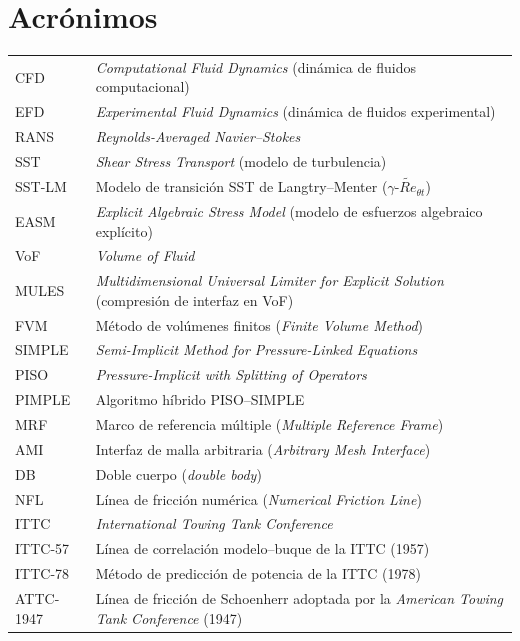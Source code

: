 \section*{Acrónimos}
\begin{longtable}{@{}p{} p{}@{}}
CFD     & \textit{Computational Fluid Dynamics} (dinámica de fluidos computacional) \\
EFD     & \textit{Experimental Fluid Dynamics} (dinámica de fluidos experimental) \\
RANS    & \textit{Reynolds-Averaged Navier--Stokes} \\
SST     & \textit{Shear Stress Transport} (modelo de turbulencia) \\
SST-LM  & Modelo de transición SST de Langtry--Menter ($\gamma$-$\widetilde{Re}_{\theta t}$) \\
EASM    & \textit{Explicit Algebraic Stress Model} (modelo de esfuerzos algebraico explícito) \\
VoF     & \textit{Volume of Fluid} \\
MULES   & \textit{Multidimensional Universal Limiter for Explicit Solution} (compresión de interfaz en VoF) \\
FVM     & Método de volúmenes finitos (\textit{Finite Volume Method}) \\
SIMPLE  & \textit{Semi-Implicit Method for Pressure-Linked Equations} \\
PISO    & \textit{Pressure-Implicit with Splitting of Operators} \\
PIMPLE  & Algoritmo híbrido PISO--SIMPLE \\
MRF     & Marco de referencia múltiple (\textit{Multiple Reference Frame}) \\
AMI     & Interfaz de malla arbitraria (\textit{Arbitrary Mesh Interface}) \\
DB      & Doble cuerpo (\textit{double body}) \\
NFL     & Línea de fricción numérica (\textit{Numerical Friction Line}) \\
ITTC    & \textit{International Towing Tank Conference} \\
ITTC-57 & Línea de correlación modelo--buque de la ITTC (1957) \\
ITTC-78 & Método de predicción de potencia de la ITTC (1978) \\
ATTC-1947 & Línea de fricción de Schoenherr adoptada por la \textit{American Towing Tank Conference} (1947) \\

\end{longtable}
